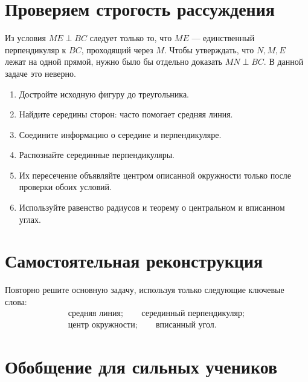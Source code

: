 \newpage
\section{Проверяем строгость рассуждения}

\begin{warningbox}
Из условия \(ME\perp BC\) следует только то, что \(ME\) — единственный
перпендикуляр к \(BC\), проходящий через \(M\). Чтобы утверждать, что
\(N,M,E\) лежат на одной прямой, нужно было бы отдельно доказать
\(MN\perp BC\). В данной задаче это неверно.

\collinearityerrorfigure
\end{warningbox}

\begin{algorithmbox}
\begin{enumerate}
  \item Достройте исходную фигуру до треугольника.
  \item Найдите середины сторон: часто помогает средняя линия.
  \item Соедините информацию о середине и перпендикуляре.
  \item Распознайте серединные перпендикуляры.
  \item Их пересечение объявляйте центром описанной окружности только после
  проверки обоих условий.
  \item Используйте равенство радиусов и теорему о центральном и вписанном углах.
\end{enumerate}
\end{algorithmbox}

\section{Самостоятельная реконструкция}

\begin{problembox}
Повторно решите основную задачу, используя только следующие ключевые слова:
\[
\begin{gathered}
\text{средняя линия};\qquad
\text{серединный перпендикуляр};\\
\text{центр окружности};\qquad
\text{вписанный угол}.
\end{gathered}
\]
\end{problembox}

\answerline[10]

\section{Обобщение для сильных учеников}


